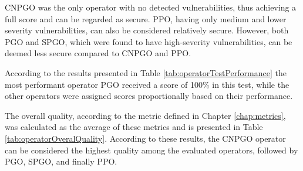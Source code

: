 CNPGO was the only operator with no detected vulnerabilities, thus achieving a full score and can be regarded as secure. PPO, having only medium and lower severity vulnerabilities, can also be considered relatively secure. However, both PGO and SPGO, which were found to have high-severity vulnerabilities, can be deemed less secure compared to CNPGO and PPO.

According to the results presented in Table \ref{tab:operatorTestPerformance} the most performant operator PGO received a score of 100\% in this test, while the other operators were assigned scores proportionally based on their performance.



The overall quality, according to the metric defined in Chapter \ref{chap:metrics}, was calculated as the average of these metrics and is presented in Table \ref{tab:operatorOveralQuality}.
According to these results, the CNPGO operator can be considered the highest quality among the evaluated operators, followed by PGO, SPGO, and finally PPO.





